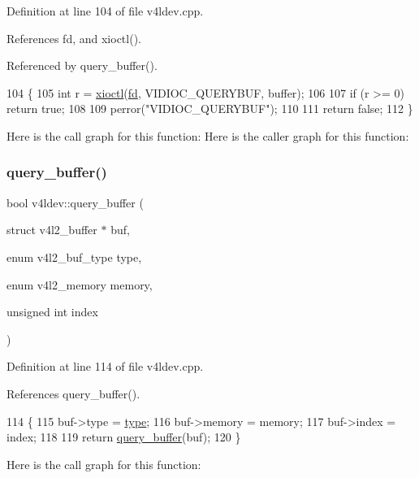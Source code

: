 Definition at line 104 of file v4ldev.\+cpp.



References fd, and xioctl().



Referenced by query\+\_\+buffer().


\begin{DoxyCode}
104                                                      \{
105     \textcolor{keywordtype}{int} r = \hyperlink{classv4ldev_ab93cb1ab18254ca362310b006bd2552d}{xioctl}(\hyperlink{classv4ldev_a2cd44be3be75a19ab8bec12b28e29142}{fd}, VIDIOC\_QUERYBUF, buffer);
106 
107     \textcolor{keywordflow}{if} (r >= 0) \textcolor{keywordflow}{return} \textcolor{keyword}{true};
108 
109     perror(\textcolor{stringliteral}{"VIDIOC\_QUERYBUF"});
110 
111     \textcolor{keywordflow}{return} \textcolor{keyword}{false};
112 \}
\end{DoxyCode}
Here is the call graph for this function\+:
Here is the caller graph for this function\+:
\mbox{\label{classv4ldev_ab5b21c7fd5893d82039fd25c6450532c}} 
\subsubsection{\texorpdfstring{query\+\_\+buffer()}{query\_buffer()}\hspace{0.1cm}{\footnotesize\ttfamily [2/2]}}
{\footnotesize\ttfamily bool v4ldev\+::query\+\_\+buffer (\begin{DoxyParamCaption}\item[{struct v4l2\+\_\+buffer $\ast$}]{buf,  }\item[{enum v4l2\+\_\+buf\+\_\+type}]{type,  }\item[{enum v4l2\+\_\+memory}]{memory,  }\item[{unsigned int}]{index }\end{DoxyParamCaption})}



Definition at line 114 of file v4ldev.\+cpp.



References query\+\_\+buffer().


\begin{DoxyCode}
114                                                                                                            
                   \{
115     buf->type = \hyperlink{classstd_1_1conditional_1_1type}{type};
116     buf->memory = memory;
117     buf->index = index;
118 
119     \textcolor{keywordflow}{return} \hyperlink{classv4ldev_a9e4d9ea82e59a99286f4cea51cc08685}{query\_buffer}(buf);
120 \}
\end{DoxyCode}
Here is the call graph for this function\+:
\mbox{\label{classv4ldev_aee765379811b24150d5a591340d9568d}} 
